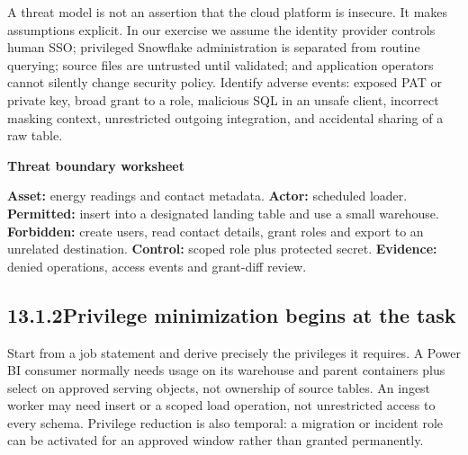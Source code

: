 \documentclass[11pt,twoside]{article}
\newcommand{\topic}[2]{\subsection*{#1\quad #2}}
\begin{document}
A threat model is not an assertion that the cloud platform is insecure. It makes assumptions explicit. In our exercise we assume the identity provider controls human SSO; privileged Snowflake administration is separated from routine querying; source files are untrusted until validated; and application operators cannot silently change security policy. Identify adverse events: exposed PAT or private key, broad grant to a role, malicious SQL in an unsafe client, incorrect masking context, unrestricted outgoing integration, and accidental sharing of a raw table.
\begin{whitebox}\textbf{Threat boundary worksheet}\par
\textbf{Asset:} energy readings and contact metadata. \textbf{Actor:} scheduled loader. \textbf{Permitted:} insert into a designated landing table and use a small warehouse. \textbf{Forbidden:} create users, read contact details, grant roles and export to an unrelated destination. \textbf{Control:} scoped role plus protected secret. \textbf{Evidence:} denied operations, access events and grant-diff review.
\end{whitebox}
\topic{13.1.2}{Privilege minimization begins at the task}
Start from a job statement and derive precisely the privileges it requires. A Power BI consumer normally needs usage on its warehouse and parent containers plus select on approved serving objects, not ownership of source tables. An ingest worker may need insert or a scoped load operation, not unrestricted access to every schema. Privilege reduction is also temporal: a migration or incident role can be activated for an approved window rather than granted permanently.
\end{document}
